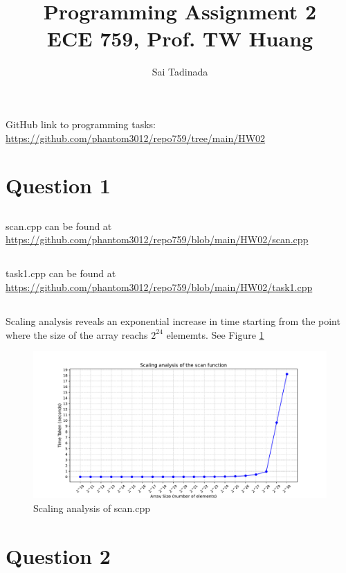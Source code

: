\documentclass[12pt]{article}
\title{Programming Assignment 2 \\ \small{ECE 759, Prof. TW Huang}}
\author{Sai Tadinada}
\date{}
\begin{document}
\maketitle

GitHub link to programming tasks: \\ \url{https://github.com/phantom3012/repo759/tree/main/HW02}

\section{Question 1}
\subsection{}
scan.cpp can be found at \url{https://github.com/phantom3012/repo759/blob/main/HW02/scan.cpp}

\subsection{}
task1.cpp can be found at \url{https://github.com/phantom3012/repo759/blob/main/HW02/task1.cpp}

\subsection{}
Scaling analysis reveals an exponential increase in time starting from the point where the size of the array reachs $2^{24}$ elememts. See Figure \ref{fig:scan_scaling}
\begin{figure}[ht]
    \includegraphics[width = \textwidth]{scan_scaling_analysis.pdf}
    \caption{Scaling analysis of scan.cpp}
    \label{fig:scan_scaling}
\end{figure}

\section{Question 2}
\end{document}

